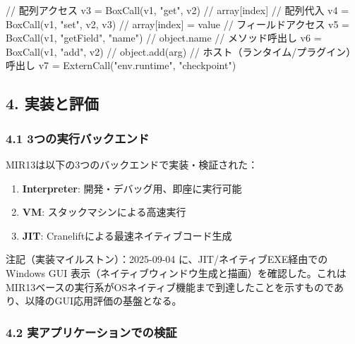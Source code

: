 \documentclass[
]{article}
\newenvironment{Shaded}{}{}
\newcommand{\NormalTok}[1]{#1}
\providecommand{\tightlist}{%
  \setlength{\itemsep}{0pt}\setlength{\parskip}{0pt}}
\begin{document}
\begin{Shaded}
\begin{Highlighting}[]
\NormalTok{// 配列アクセス}
\NormalTok{v3 = BoxCall(v1, "get", v2)           // array[index]}
\NormalTok{// 配列代入}
\NormalTok{v4 = BoxCall(v1, "set", v2, v3)       // array[index] = value}
\NormalTok{// フィールドアクセス}
\NormalTok{v5 = BoxCall(v1, "getField", "name")  // object.name}
\NormalTok{// メソッド呼出し}
\NormalTok{v6 = BoxCall(v1, "add", v2)           // object.add(arg)}
\NormalTok{// ホスト（ランタイム/プラグイン）呼出し}
\NormalTok{v7 = ExternCall("env.runtime", "checkpoint")}
\end{Highlighting}
\end{Shaded}

\hypertarget{ux5b9fux88c5ux3068ux8a55ux4fa1}{%
\subsection{4. 実装と評価}\label{ux5b9fux88c5ux3068ux8a55ux4fa1}}

\hypertarget{ux3064ux306eux5b9fux884cux30d0ux30c3ux30afux30a8ux30f3ux30c9}{%
\subsubsection{4.1
3つの実行バックエンド}\label{ux3064ux306eux5b9fux884cux30d0ux30c3ux30afux30a8ux30f3ux30c9}}

MIR13は以下の3つのバックエンドで実装・検証された：

\begin{enumerate}
\def\labelenumi{\arabic{enumi}.}
\tightlist
\item
  \textbf{Interpreter}: 開発・デバッグ用、即座に実行可能
\item
  \textbf{VM}: スタックマシンによる高速実行
\item
  \textbf{JIT}: Craneliftによる最速ネイティブコード生成
\end{enumerate}

注記（実装マイルストン）：2025-09-04 に、JIT/ネイティブEXE経由での
Windows GUI
表示（ネイティブウィンドウ生成と描画）を確認した。これはMIR13ベースの実行系がOSネイティブ機能まで到達したことを示すものであり、以降のGUI応用評価の基盤となる。

\hypertarget{ux5b9fux30a2ux30d7ux30eaux30b1ux30fcux30b7ux30e7ux30f3ux3067ux306eux691cux8a3c}{%
\subsubsection{4.2
実アプリケーションでの検証}\label{ux5b9fux30a2ux30d7ux30eaux30b1ux30fcux30b7ux30e7ux30f3ux3067ux306eux691cux8a3c}}
\end{document}

